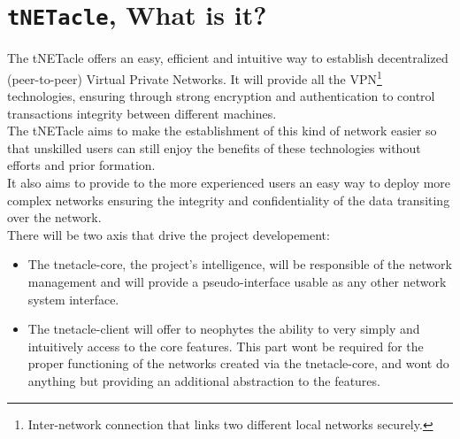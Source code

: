 \section{\texttt{tNETacle}, What is it?}
The tNETacle offers an easy, efficient and intuitive way to establish
decentralized (peer-to-peer) Virtual Private Networks. It will provide all the
VPN\footnote{Inter-network connection that links two different local networks
securely.} technologies, ensuring through strong encryption and authentication to
control transactions integrity between different machines.\\

The tNETacle aims to make the establishment of this kind of network easier so
that unskilled users can still enjoy the benefits of these technologies without efforts and
prior formation.\\

It also aims to provide to the more experienced users an easy way to
deploy more complex networks ensuring the integrity and confidentiality of the
data transiting over the network.\\

There will be two axis that drive the project developement:
\begin{itemize}
\item The tnetacle-core, the project's intelligence, will be responsible of the
network management and will provide a pseudo-interface usable as any other
network system interface.
\item The tnetacle-client will offer to neophytes the ability to very simply and
intuitively access to the core features. This part wont be required for the
proper functioning of the networks created via the tnetacle-core, and wont do
anything but providing an additional abstraction to the features.
\end{itemize}
